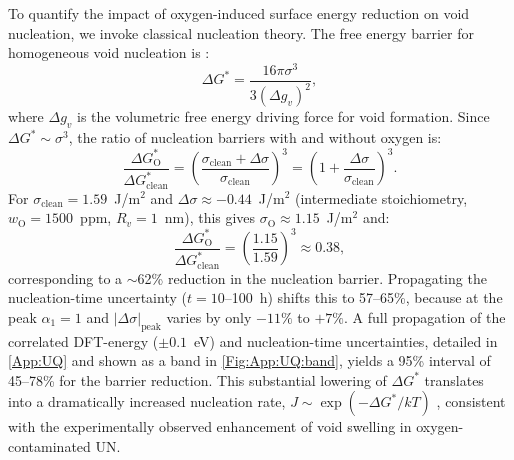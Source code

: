 \documentclass[preprint,12pt,sort&compress]{elsarticle}
\newcommand{\?}{\stackrel{?}{=}}
\begin{document}
To quantify the impact of oxygen-induced surface energy reduction on void nucleation, we invoke classical nucleation theory. The free energy barrier for homogeneous void nucleation is \cite{Fultz2020}:
\begin{equation}
\Delta G^* = \frac{16 \pi \sigma^3}{3 (\Delta g_v)^2},
\end{equation}
where $\Delta g_v$ is the volumetric free energy driving force for void formation. Since $\Delta G^* \sim \sigma^3$, the ratio of nucleation barriers with and without oxygen is:
\begin{equation}
\frac{\Delta G^*_\text{O}}{\Delta G^*_\text{clean}} = \left( \frac{\sigma_\text{clean} + \Delta \sigma}{\sigma_\text{clean}} \right)^3 = \left( 1 + \frac{\Delta \sigma}{\sigma_\text{clean}} \right)^3.
\end{equation}
For $\sigma_\text{clean} = 1.59$~J/m$^2$ and $\Delta \sigma \approx -0.44$~J/m$^2$ (intermediate stoichiometry, $w_\text{O} = 1500$~ppm, $R_v = 1$~nm), this gives $\sigma_\text{O} \approx 1.15$~J/m$^2$ and:
\begin{equation}
\frac{\Delta G^*_\text{O}}{\Delta G^*_\text{clean}} = \left( \frac{1.15}{1.59} \right)^3 \approx 0.38,
\end{equation}
corresponding to a $\sim$62\% reduction in the nucleation barrier. Propagating the nucleation-time uncertainty ($t = 10$--100~h) shifts this to 57--65\%, because at the peak $\alpha_1 = 1$ and $|\Delta\sigma|_\text{peak}$ varies by only $-11\%$ to $+7\%$. A full propagation of the correlated DFT-energy ($\pm0.1$~eV) and nucleation-time uncertainties, detailed in \ref{App:UQ} and shown as a band in \cref{Fig:App:UQ:band}, yields a 95\% interval of 45--78\% for the barrier reduction. This substantial lowering of $\Delta G^*$ translates into a dramatically increased nucleation rate, $J \sim \exp(-\Delta G^*/kT)$ \cite{Fultz2020}, consistent with the experimentally observed enhancement of void swelling in oxygen-contaminated UN.

\end{document}
